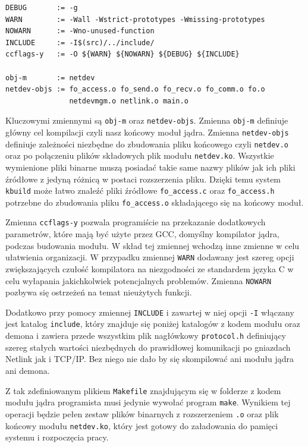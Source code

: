 \documentclass[11pt]{scrartcl}
\begin{document}
\begin{verbatim}
DEBUG       := -g
WARN        := -Wall -Wstrict-prototypes -Wmissing-prototypes
NOWARN      := -Wno-unused-function
INCLUDE     := -I$(src)/../include/
ccflags-y   := -O ${WARN} ${NOWARN} ${DEBUG} ${INCLUDE}

obj-m       := netdev
netdev-objs := fo_access.o fo_send.o fo_recv.o fo_comm.o fo.o
               netdevmgm.o netlink.o main.o
\end{verbatim}

Kluczowymi zmiennymi są \texttt{obj-m} oraz \texttt{netdev-objs}. Zmienna \texttt{obj-m} definiuje główny cel kompilacji czyli nasz końcowy moduł jądra. Zmienna \texttt{netdev-objs} definiuje zależności niezbędne do zbudowania pliku końcowego czyli \texttt{netdev.o} oraz po połączeniu plików składowych plik modułu \texttt{netdev.ko}. Wszystkie wymienione pliki binarne muszą posiadać takie same nazwy plików jak ich pliki źródłowe z jedyną różnicą w postaci rozszerzenia pliku. Dzięki temu system \texttt{kbuild} może łatwo znaleźć pliki źródłowe \texttt{fo\_access.c} oraz \texttt{fo\_access.h} potrzebne do zbudowania pliku \texttt{fo\_access.o} składającego się na końcowy moduł.

Zmienna \texttt{ccflags-y} pozwala programiście na przekazanie dodatkowych parametrów, które mają być użyte przez GCC, domyślny kompilator jądra, podczas budowania modułu. W skład tej zmiennej wchodzą inne zmienne w celu ułatwienia organizacji. W przypadku zmiennej \texttt{WARN} dodawany jest szereg opcji zwiększających czułość kompilatora na niezgodności ze standardem języka C w celu wyłapania jakichkolwiek potencjalnych problemów. Zmienna \texttt{NOWARN} pozbywa się ostrzeżeń na temat nieużytych funkcji.

Dodatkowo przy pomocy zmiennej \texttt{INCLUDE} i zawartej w niej opcji \texttt{-I} włączany jest katalog \texttt{include}, który znajduje się poniżej katalogów z kodem modułu oraz demona i zawiera przede wszystkim plik nagłówkowy \texttt{protocol.h} definiujący szereg stałych wartości niezbędnych do prawidłowej komunikacji po gniazdach Netlink jak i TCP/IP\@. Bez niego nie dało by się skompilować ani modułu jądra ani demona.

Z tak zdefiniowanym plikiem \texttt{Makefile} znajdującym się w folderze z kodem modułu jądra programista musi jedynie wywołać program \texttt{make}. Wynikiem tej operacji będzie pełen zestaw plików binarnych z rozszerzeniem \texttt{.o} oraz plik końcowy modułu \texttt{netdev.ko}, który jest gotowy do załadowania do pamięci systemu i rozpoczęcia pracy.
\end{document}
